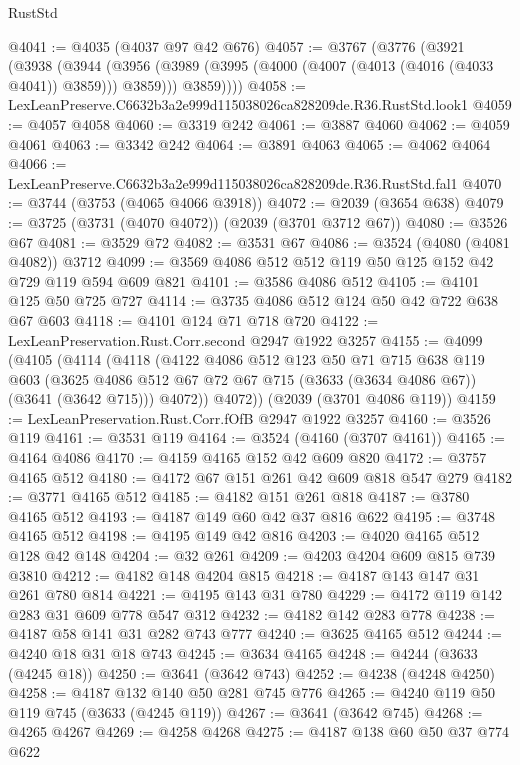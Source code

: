 \begin{lexlean}{RustStd}
\begin{coremodule}
@4041 := @4035 (@4037 @97 @42 @676)
@4057 := @3767
    (@3776
      (@3921
        (@3938
          (@3944
            (@3956 (@3989 (@3995 (@4000 (@4007 (@4013 (@4016 (@4033 @4041)) @3859))) @3859)))
            @3859))))
@4058 := LexLeanPreserve.C6632b3a2e999d115038026ca828209de.R36.RustStd.look1
@4059 := @4057 @4058
@4060 := @3319 @242
@4061 := @3887 @4060
@4062 := @4059 @4061
@4063 := @3342 @242
@4064 := @3891 @4063
@4065 := @4062 @4064
@4066 := LexLeanPreserve.C6632b3a2e999d115038026ca828209de.R36.RustStd.fal1
@4070 := @3744 (@3753 (@4065 @4066 @3918))
@4072 := @2039 (@3654 @638)
@4079 := @3725 (@3731 (@4070 @4072)) (@2039 (@3701 @3712 @67))
@4080 := @3526 @67
@4081 := @3529 @72
@4082 := @3531 @67
@4086 := @3524 (@4080 (@4081 @4082)) @3712
@4099 := @3569 @4086 @512 @512 @119 @50 @125 @152 @42 @729 @119 @594 @609 @821
@4101 := @3586 @4086 @512
@4105 := @4101 @125 @50 @725 @727
@4114 := @3735 @4086 @512 @124 @50 @42 @722 @638 @67 @603
@4118 := @4101 @124 @71 @718 @720
@4122 := LexLeanPreservation.Rust.Corr.second @2947 @1922 @3257
@4155 := @4099
    (@4105
      (@4114
        (@4118
          (@4122
            @4086
            @512
            @123
            @50
            @71
            @715
            @638
            @119
            @603
            (@3625 @4086 @512 @67 @72 @67 @715 (@3633 (@3634 @4086 @67)) (@3641 (@3642 @715)))
            @4072))
        @4072))
    (@2039 (@3701 @4086 @119))
@4159 := LexLeanPreservation.Rust.Corr.fOfB @2947 @1922 @3257
@4160 := @3526 @119
@4161 := @3531 @119
@4164 := @3524 (@4160 (@3707 @4161))
@4165 := @4164 @4086
@4170 := @4159 @4165 @152 @42 @609 @820
@4172 := @3757 @4165 @512
@4180 := @4172 @67 @151 @261 @42 @609 @818 @547 @279
@4182 := @3771 @4165 @512
@4185 := @4182 @151 @261 @818
@4187 := @3780 @4165 @512
@4193 := @4187 @149 @60 @42 @37 @816 @622
@4195 := @3748 @4165 @512
@4198 := @4195 @149 @42 @816
@4203 := @4020 @4165 @512 @128 @42 @148
@4204 := @32 @261
@4209 := @4203 @4204 @609 @815 @739 @3810
@4212 := @4182 @148 @4204 @815
@4218 := @4187 @143 @147 @31 @261 @780 @814
@4221 := @4195 @143 @31 @780
@4229 := @4172 @119 @142 @283 @31 @609 @778 @547 @312
@4232 := @4182 @142 @283 @778
@4238 := @4187 @58 @141 @31 @282 @743 @777
@4240 := @3625 @4165 @512
@4244 := @4240 @18 @31 @18 @743
@4245 := @3634 @4165
@4248 := @4244 (@3633 (@4245 @18))
@4250 := @3641 (@3642 @743)
@4252 := @4238 (@4248 @4250)
@4258 := @4187 @132 @140 @50 @281 @745 @776
@4265 := @4240 @119 @50 @119 @745 (@3633 (@4245 @119))
@4267 := @3641 (@3642 @745)
@4268 := @4265 @4267
@4269 := @4258 @4268
@4275 := @4187 @138 @60 @50 @37 @774 @622

\end{coremodule}
\end{lexlean}
